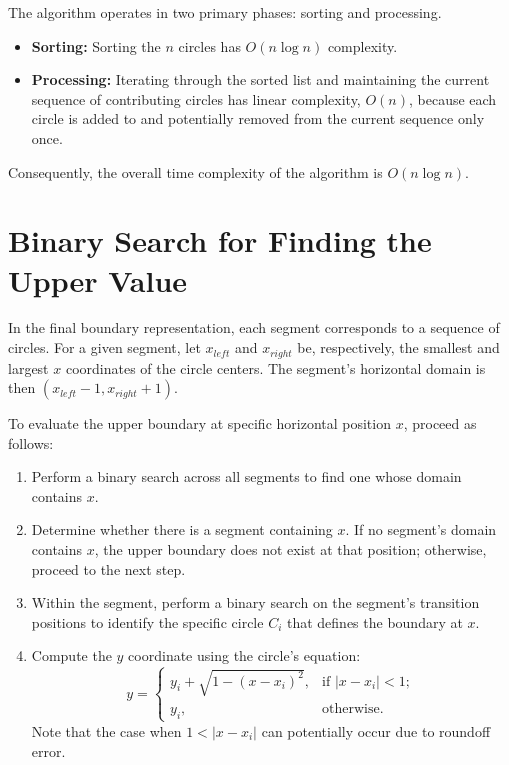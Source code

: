 \documentclass[12pt]{article}
\begin{document}
The algorithm operates in two primary phases: sorting and processing.

\begin{itemize}
    \item \textbf{Sorting:} Sorting the $n$ circles has $O(n \log n)$ complexity. \cite{Knuth1998}
    \item \textbf{Processing:} Iterating through the sorted list and maintaining the current sequence
    of contributing circles has linear complexity, $O(n)$, because each circle is added
    to and potentially removed from the current sequence only once.
\end{itemize}

Consequently, the overall time complexity of the algorithm is $O(n \log n)$.

\section{Binary Search for Finding the Upper Value}

In the final boundary representation, each segment corresponds to a sequence of
circles. For a given segment, let $x_{left}$ and $x_{right}$ be, respectively, the smallest and
largest $x$ coordinates of the circle centers. The segment's horizontal domain is then
$(x_{left} - 1, x_{right} + 1)$.

To evaluate the upper boundary at specific horizontal position $x$, proceed as follows:

\begin{enumerate}
    \item Perform a binary search across all segments to find one whose domain contains $x$.
    \item Determine whether there is a segment containing $x$. If no segment's domain
    contains $x$, the upper boundary does not exist at that position; otherwise, proceed
    to the next step.
    \item Within the segment, perform a binary search on the segment's transition positions
    to identify the specific circle $C_i$ that defines the boundary at $x$.
    \item Compute the $y$ coordinate using the circle's equation:
    \[
    y =
    \begin{cases}
        y_i + \sqrt{1 - (x - x_i)^2}, & \text{if } |x - x_i| < 1; \\
        y_i, & \text{otherwise.}
    \end{cases}
    \]
    Note that the case when $1 < |x - x_i|$ can potentially occur due to roundoff error.
\end{enumerate}
\end{document}
